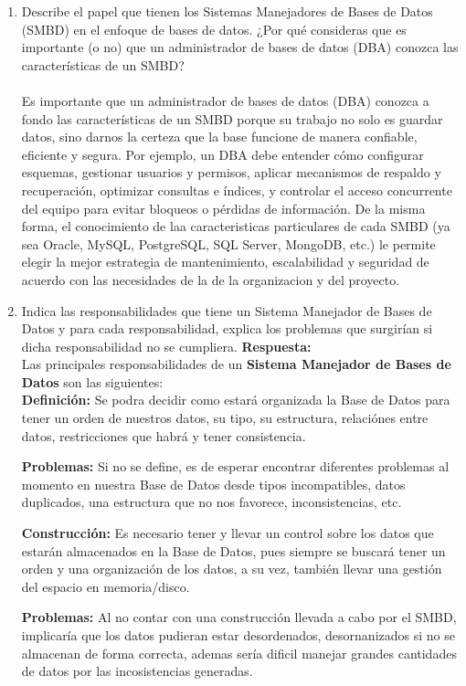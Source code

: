 \documentclass[12pt]{report}
\begin{document}
\begin{enumerate}[label=\textbf{\arabic*.}, leftmargin=*]
\begin{enumerate}[label=\textbf{\alph*.}, leftmargin=*, itemsep=1.0em]
\item Describe el papel que tienen los Sistemas Manejadores de Bases de Datos (SMBD) en el enfoque de bases de datos. ¿Por qu\'e consideras que es importante (o no) que un administrador de bases de datos (DBA) conozca las caracter\'isticas de un SMBD?\\
\\
    Es importante que un administrador de bases de datos (DBA) conozca a fondo las características de un SMBD porque su trabajo no solo es guardar datos, sino darnos la certeza que la base funcione de manera confiable, eficiente y segura. Por ejemplo, un DBA debe entender cómo configurar esquemas, gestionar usuarios y permisos, aplicar mecanismos de respaldo y recuperación, optimizar consultas e índices, y controlar el acceso concurrente del equipo para evitar bloqueos o pérdidas de información. De la misma forma, el conocimiento de laa caracteristicas particulares de cada SMBD (ya sea Oracle, MySQL, PostgreSQL, SQL Server, MongoDB, etc.) le permite elegir la mejor estrategia de mantenimiento, escalabilidad y seguridad de acuerdo con las necesidades de la de la organizacion y del proyecto.




\item Indica las responsabilidades que tiene un Sistema Manejador de Bases de Datos y para cada responsabilidad, explica los problemas que surgir\'ian si dicha responsabilidad no se cumpliera.
\textbf{Respuesta:}\\
Las principales responsabilidades de un \textbf{Sistema Manejador de Bases de Datos} son las siguientes:\\
\textbf{Definición:} Se podra decidir como estará organizada la Base de Datos para tener un orden de nuestros datos, su tipo, su estructura, relaciónes entre datos, restricciones que habrá y tener consistencia.

\hspace{0.3cm}\textbf{Problemas:} Si no se define, es de esperar encontrar diferentes problemas al momento en nuestra Base de Datos desde tipos incompatibles, datos duplicados, una estructura que no nos favorece, inconsistencias, etc.


\textbf{Construcción:}
Es necesario tener y llevar un control sobre los datos que estarán almacenados en la Base de Datos, pues siempre se buscará tener un orden y una organización de los datos, a su vez, también llevar una gestión del espacio en memoria/disco.

\hspace{0.3cm}\textbf{Problemas:}
Al no contar con una construcción llevada a cabo por el SMBD, implicaría que los datos pudieran estar desordenados, desornanizados si no se almacenan de forma correcta, ademas sería dificil manejar grandes cantidades de datos por las incosistencias generadas.



\end{enumerate}
\end{enumerate}
\end{document}
